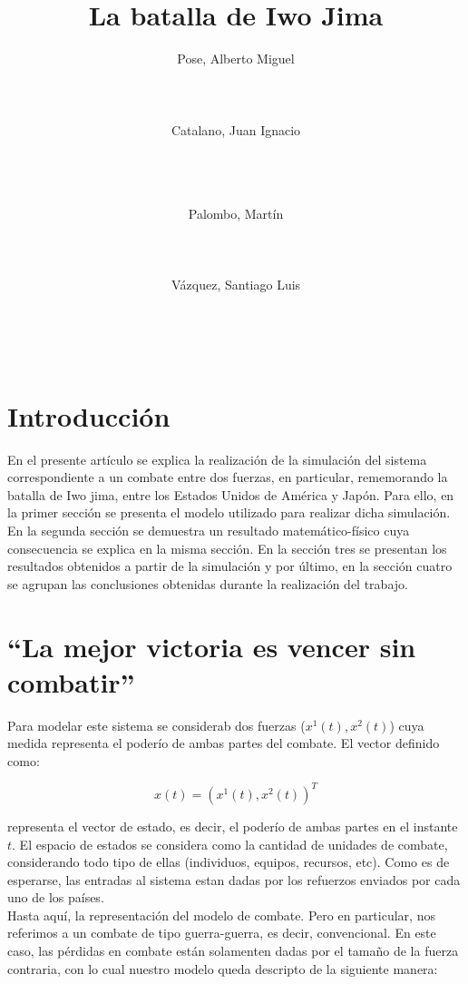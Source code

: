 \documentclass{sig-alternate}
\title{La batalla de Iwo Jima}
\author{
\alignauthor
Pose, Alberto Miguel\\
       \affaddr{ITBA}\\
       \affaddr{Madero 399}\\
       \affaddr{Buenos Aires, Argentina}\\
       \email{apose@alu.itba.edu.ar}
\alignauthor
Catalano, Juan Ignacio\\
       \affaddr{ITBA}\\
       \affaddr{Madero 399}\\
       \affaddr{Buenos Aires, Argentina}\\
       \email{jcatalan@alu.itba.edu.ar}
\and
\alignauthor 
Palombo, Martín\\
       \affaddr{ITBA}\\
       \affaddr{Madero 399}\\
       \affaddr{Buenos Aires, Argentina}\\
       \email{mpalombo@alu.itba.edu.ar}
\alignauthor 
Vázquez, Santiago Luis\\
       \affaddr{ITBA}\\
       \affaddr{Madero 399}\\
       \affaddr{Buenos Aires, Argentina}\\
       \email{savazque@alu.itba.edu.ar}
}
\date{}
\begin{document}
\maketitle


\newpage

\section{Introducci\'on}

En el presente art\'iculo se explica la realizaci\'on de la simulaci\'on del sistema correspondiente a un combate entre dos fuerzas, 
en particular, rememorando la batalla de Iwo jima, entre los Estados Unidos de Am\'erica y Jap\'on. Para ello, en la primer secci\'on se 
presenta el modelo utilizado para realizar dicha simulaci\'on. En la segunda secci\'on se demuestra un resultado matem\'atico-f\'isico cuya 
consecuencia se explica en la misma secci\'on. En la secci\'on tres se presentan los resultados obtenidos a partir de la simulaci\'on y 
por \'ultimo, en la secci\'on cuatro se agrupan las conclusiones obtenidas durante la realizaci\'on del trabajo.

\section{``La mejor victoria es vencer sin combatir''}
Para modelar este sistema se considerab dos fuerzas ($x^1(t), x^2(t)$) cuya medida representa el poderío de ambas partes del combate. 
El vector definido como:

\begin{equation}
x(t) = ( x^1(t), x^2(t) )^T \label{eq:state_vector}
\end{equation}

representa el vector de estado, es decir, el poderío de ambas partes en el instante $t$. El espacio de estados se considera como la cantidad de 
unidades de combate, considerando todo tipo de ellas (individuos, equipos, recursos, etc). Como es de esperarse, las entradas al sistema estan 
dadas por los refuerzos enviados por cada uno de los países.\\
Hasta aquí, la representación del modelo de combate. Pero en particular, nos referimos a un combate de tipo guerra-guerra, es decir, convencional.
En este caso, las pérdidas en combate están solamenten dadas por el tamaño de la fuerza contraria, con lo cual nuestro modelo queda descripto de la
siguiente manera:
\end{document}
